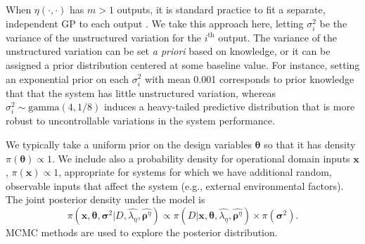 \documentclass[twocolumn,10pt]{asme2ej}
\begin{document}
%
When $\eta(\cdot,\cdot)$ has $m>1$ outputs, it is standard practice to fit a separate, independent GP to each output \cite{Picheny2015}.
%
We take this approach here, letting $\sigma^2_i$ be the variance of the unstructured variation for the $i^\text{th}$ output.
%
%
The variance of the unstructured variation can be set {\em a priori} based on knowledge, or it can be assigned a prior distribution centered at some baseline value. For instance, setting an exponential prior on each $\sigma_i^2$ with mean 0.001 corresponds to prior knowledge that that the system has little unstructured variation, whereas $\sigma_i^2 \sim \text{gamma}(4, 1/8)$ induces a heavy-tailed predictive distribution that is more robust to uncontrollable variations in the system performance. 

%
We typically take a uniform prior on the design variables $\boldsymbol\theta$ so that it has density $\pi(\boldsymbol \theta) \propto 1$. We include also a probability density for operational domain inputs $\boldsymbol x$, $\pi(\boldsymbol x) \propto 1$, appropriate for systems for which we have additional random, observable inputs that affect the system (e.g., external environmental factors). The joint posterior density under the model is
%
\begin{equation} \label{eq:full_dist}
\pi(\boldsymbol x, \boldsymbol \theta,\boldsymbol \sigma^2| D,\widehat{\lambda_\eta},\widehat{\boldsymbol \rho^\eta})
\propto \pi(D | \boldsymbol{x}, \boldsymbol \theta,\widehat{\lambda_\eta}, \widehat{\boldsymbol \rho^\eta}) \times \pi(\boldsymbol \sigma^2).
\end{equation}
%
MCMC methods are used to explore the posterior distribution.
%
\end{document}
